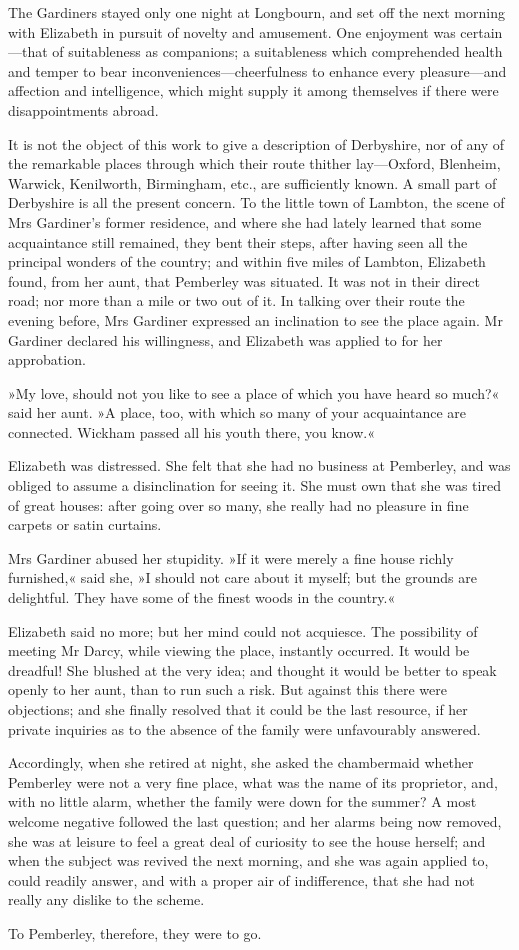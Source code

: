 The Gardiners stayed only one night at Longbourn, and set off the next morning with Elizabeth in pursuit of novelty and amusement. One enjoyment was certain—that of suitableness as companions; a suitableness which comprehended health and temper to bear inconveniences—cheerfulness to enhance every pleasure—and affection and intelligence, which might supply it among themselves if there were disappointments abroad.

It is not the object of this work to give a description of Derbyshire, nor of any of the remarkable places through which their route thither lay—Oxford, Blenheim, Warwick, Kenilworth, Birmingham, etc., are sufficiently known. A small part of Derbyshire is all the present concern. To the little town of Lambton, the scene of Mrs Gardiner's former residence, and where she had lately learned that some acquaintance still remained, they bent their steps, after having seen all the principal wonders of the country; and within five miles of Lambton, Elizabeth found, from her aunt, that Pemberley was situated. It was not in their direct road; nor more than a mile or two out of it. In talking over their route the evening before, Mrs Gardiner expressed an inclination to see the place again. Mr Gardiner declared his willingness, and Elizabeth was applied to for her approbation.

»My love, should not you like to see a place of which you have heard so much?« said her aunt. »A place, too, with which so many of your acquaintance are connected. Wickham passed all his youth there, you know.«

Elizabeth was distressed. She felt that she had no business at Pemberley, and was obliged to assume a disinclination for seeing it. She must own that she was tired of great houses: after going over so many, she really had no pleasure in fine carpets or satin curtains.

Mrs Gardiner abused her stupidity. »If it were merely a fine house richly furnished,« said she, »I should not care about it myself; but the grounds are delightful. They have some of the finest woods in the country.«

Elizabeth said no more; but her mind could not acquiesce. The possibility of meeting Mr Darcy, while viewing the place, instantly occurred. It would be dreadful! She blushed at the very idea; and thought it would be better to speak openly to her aunt, than to run such a risk. But against this there were objections; and she finally resolved that it could be the last resource, if her private inquiries as to the absence of the family were unfavourably answered.

Accordingly, when she retired at night, she asked the chambermaid whether Pemberley were not a very fine place, what was the name of its proprietor, and, with no little alarm, whether the family were down for the summer? A most welcome negative followed the last question; and her alarms being now removed, she was at leisure to feel a great deal of curiosity to see the house herself; and when the subject was revived the next morning, and she was again applied to, could readily answer, and with a proper air of indifference, that she had not really any dislike to the scheme.

To Pemberley, therefore, they were to go.